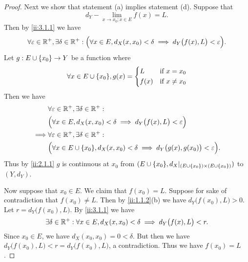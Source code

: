 \begin{proof}
  Next we show that statement (a) implies statement (d).
  Suppose that
  \[
    d_Y - \lim_{x \to x_0 ; x \in E} f(x) = L.
  \]
  Then by \cref{ii:3.1.1} we have
  \[
    \forall \varepsilon \in \mathbb{R}^+, \exists \delta \in \mathbb{R}^+ : \Big(\forall x \in E, d_X(x, x_0) < \delta \implies d_Y\big(f(x), L\big) < \varepsilon\Big).
  \]
  Let \(g : E \cup \left\lbrace x_0\right\rbrace \to Y\) be a function where
  \[
    \forall x \in E \cup \set{x_0}, g(x) = \begin{dcases}
      L    & \text{if } x = x_0    \\
      f(x) & \text{if } x \neq x_0
    \end{dcases}
  \]
  Then we have
  \begin{align*}
             & \forall \varepsilon \in \R^+, \exists \delta \in \R^+ :                                                          \\
             & \Big(\forall x \in E, d_X(x, x_0) < \delta \implies d_Y\big(f(x), L\big) < \varepsilon\Big)                      \\
    \implies & \forall \varepsilon \in \R^+, \exists \delta \in \R^+ :                                                          \\
             & \Big(\forall x \in E \cup \set{x_0}, d_X(x, x_0) < \delta \implies d_Y\big(g(x), g(x_0)\big) < \varepsilon\Big).
  \end{align*}
  Thus by \cref{ii:2.1.1} \(g\) is continuous at \(x_0\) from \((E \cup \set{x_0}, d_X|_{(E \cup \set{x_0}) \times (E \cup \set{x_0})})\) to \((Y, d_Y)\).

  Now suppose that \(x_0 \in E\).
  We claim that \(f(x_0) = L\).
  Suppose for sake of contradiction that \(f(x_0) \neq L\).
  Then by \cref{ii:1.1.2}(b) we have \(d_Y\big(f(x_0), L\big) > 0\).
  Let \(r = d_Y\big(f(x_0), L\big)\).
  By \cref{ii:3.1.1} we have
  \[
    \exists \delta \in \mathbb{R}^+ : \forall x \in E, d_X(x, x_0) < \delta \implies d_Y\big(f(x), L\big) < r.
  \]
  Since \(x_0 \in E\), we have \(d_X(x_0, x_0) = 0 < \delta\).
  But then we have \(d_Y\big(f(x_0), L\big) < r = d_Y\big(f(x_0), L\big)\), a contradiction.
  Thus we have \(f(x_0) = L\).


\end{proof}
